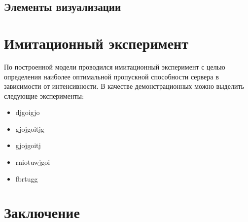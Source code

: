 \subsection{Элементы визуализации}

\newpage
\section{Имитационный эксперимент}
По построенной модели проводился имитационный эксперимент с целью определения наиболее
оптимальной пропускной способности сервера в зависимости от интенсивности.
В качестве демонстрационных можно выделить следующие эксперименты:
\begin{itemize}
    \item djgoigjo
    \item gjojgoitjg
    \item gjojgoitj
    \item rniotuwjgoi
    \item fbrtugg
\end{itemize}



\newpage
\section{Заключение}



